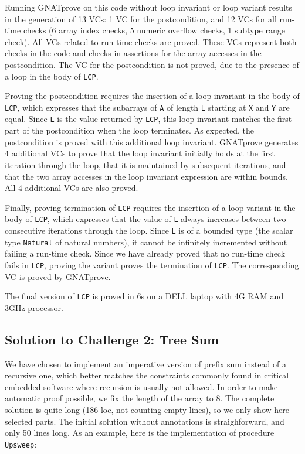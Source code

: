 \documentclass[sttt,draft]{svjour}
\newcommand{\gnatprove}{GNATprove\xspace}
\begin{document}
Running \gnatprove on this code without loop invariant or loop variant results
in the generation of 13 VCs: 1 VC for the postcondition, and 12 VCs for all
run-time checks (6 array index checks, 5 numeric overflow checks, 1 subtype
range check). All VCs related to run-time checks are proved. These VCs
represent both checks in the code and checks in assertions for the array
accesses in the postcondition. The VC for the postcondition is not proved, due
to the presence of a loop in the body of \verb|LCP|.

Proving the postcondition requires the insertion of a loop invariant in the
body of \verb|LCP|, which expresses that the subarrays of \verb|A| of length
\verb|L| starting at \verb|X| and \verb|Y| are equal. Since \verb|L| is the
value returned by \verb|LCP|, this loop invariant matches the first part of the
postcondition when the loop terminates. As expected, the postcondition is
proved with this additional loop invariant. \gnatprove generates 4 additional
VCs to prove that the loop invariant initially holds at the first iteration
through the loop, that it is maintained by subsequent iterations, and that the
two array accesses in the loop invariant expression are within bounds. All 4
additional VCs are also proved.

Finally, proving termination of \verb|LCP| requires the insertion of a loop
variant in the body of \verb|LCP|, which expresses that the value of \verb|L|
always increases between two consecutive iterations through the loop. Since
\verb|L| is of a bounded type (the scalar type \verb|Natural| of natural
numbers), it cannot be infinitely incremented without failing a run-time
check. Since we have already proved that no run-time check fails in \verb|LCP|,
proving the variant proves the termination of \verb|LCP|. The corresponding VC
is proved by \gnatprove.

The final version of \verb|LCP| is proved in 6s on a DELL laptop with 4G RAM
and 3GHz processor.

\subsection{Solution to Challenge 2: Tree Sum}

We have chosen to implement an imperative version of prefix sum instead of a
recursive one, which better matches the constraints commonly found in critical
embedded software where recursion is usually not allowed. In order to make
automatic proof possible, we fix the length of the array to 8. The complete
solution is quite long (186 loc, not counting empty lines), so we only show
here selected parts. The initial solution without annotations is
straighforward, and only 50 lines long. As an example, here is the
implementation of procedure \verb|Upsweep|:
\end{document}
